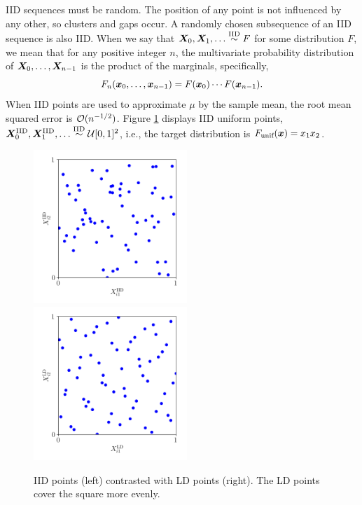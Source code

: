 \documentclass[graybox,footinfo]{svmult}
\newcommand{\IID}{\textup{IID}}
\newcommand{\unif}{\textup{unif}}
\newcommand{\IIDsim}{\overset{\IID}{\sim}}
\begin{document}
IID sequences must be random. The position of any point is not influenced by any other, so clusters and gaps occur.  A randomly chosen subsequence of an IID sequence is also IID.  When we say that $\bsX_0, \bsX_1, \ldots \IIDsim F$ for some distribution $F$, we mean that for any positive integer $n$, the  multivariate probability distribution of ${\boldsymbol{X}}_0, \ldots, {\boldsymbol{X}}_{n-1}$ is the product of the marginals, specifically,
\begin{equation*}
	F_{n}({\boldsymbol{x}}_0, \ldots, {\boldsymbol{x}}_{n-1}) = F({\boldsymbol{x}}_0) \cdots  F({\boldsymbol{x}}_{n-1}).
\end{equation*}
When IID points are used to approximate $\mu$ by the sample mean, the root mean squared error is ${\mathcal{O}}(n^{-1/2})$.  Figure \ref{fig:comparePts} displays IID uniform points, $\bsX^{\IID}_0, \bsX^{\IID}_1, \ldots \IIDsim \calU[0,1]^2$, i.e.,  the target distribution is $F_\unif(\bsx) = x_1 x_2$.


\begin{figure}[t]
	\includegraphics[height=5.8cm]{QMCSoftwareArticle/figs/dd_iid_uniform_pts.png}
	\quad
	\includegraphics[height=5.8cm]{QMCSoftwareArticle/figs/dd_sobol_pts.png}
	\caption{IID points (left) contrasted with LD points (right).  The LD points cover the square more evenly.}
	\label{fig:comparePts}
\end{figure}
\end{document}
